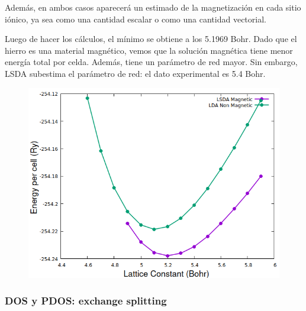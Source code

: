     Además, en ambos casos aparecerá un estimado de la magnetización en cada sitio iónico, ya sea como una cantidad escalar o como una cantidad vectorial.
      \begin{figure}[H]
          \centering
      \end{figure}

    Luego de hacer los cálculos, el mínimo se obtiene a los 5.1969 Bohr. Dado que el hierro es una material magnético, vemos que la solución magnética tiene menor energía total por celda. Además, tiene un parámetro de red mayor. Sin embargo, LSDA subestima el parámetro de red: el dato experimental es 5.4 Bohr.
    \begin{figure}[H]
        \centering
        \includegraphics[scale = 0.6]{figs/D7/comparacion.png}
    \end{figure}

\subsubsection{DOS y PDOS: exchange splitting}

